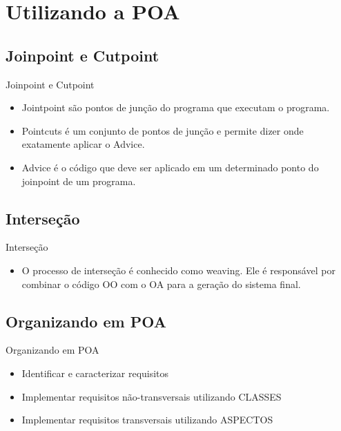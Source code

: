 \documentclass{beamer}
\begin{document}
\section{Utilizando a POA}
\subsection{Joinpoint e Cutpoint}
\begin{frame}{Joinpoint e Cutpoint}
\begin{itemize}


    \item {Jointpoint são pontos de junção do programa que executam o programa.
    }
    \item { Pointcuts é um conjunto de pontos de junção e permite dizer onde exatamente aplicar o Advice.
    }
    \item {Advice é o código que deve ser aplicado em um determinado ponto do joinpoint de um programa.
    }
    
    
\end{itemize}

\end{frame}

\subsection{Interseção}
\begin{frame}{Interseção}

\begin{itemize}


    \item {O processo de interseção é conhecido como weaving.
                 Ele é responsável por combinar o código OO com o OA para a geração do sistema final.
          }
    
          
\end{itemize}

\end{frame}


\subsection{Organizando em POA}
\begin{frame}{Organizando em POA}

\begin{itemize}
    \item {Identificar e caracterizar requisitos \pause
    
    }
    \item {Implementar requisitos não-transversais utilizando CLASSES
    
    }
    \item { Implementar requisitos transversais utilizando ASPECTOS
    
    }
\end{itemize}
    
\end{frame}
\end{document}
